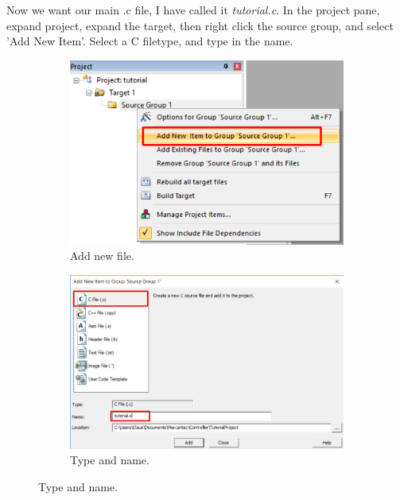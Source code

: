 \documentclass{article}
\begin{document}
Now we want our main .c file, I have called it \textit{tutorial.c}.
In the project pane, expand project, expand the target, then right click the
source group, and select 'Add New Item'. Select a C filetype, and type in the name.
\begin{figure}[H]
    \centering
    \begin{subfigure}[b]{0.45\linewidth}
        \includegraphics[width=\linewidth]{pics/AddNewFile.png}
        \caption{Add new file.}
    \end{subfigure}
    \begin{subfigure}[b]{0.45\linewidth}
        \includegraphics[width=\linewidth]{pics/AddNewFileDialog.png}
        \caption{Type and name.}
    \end{subfigure}
    \label{fig:AddNewFile}
\end{figure}

\newpage
\end{document}

